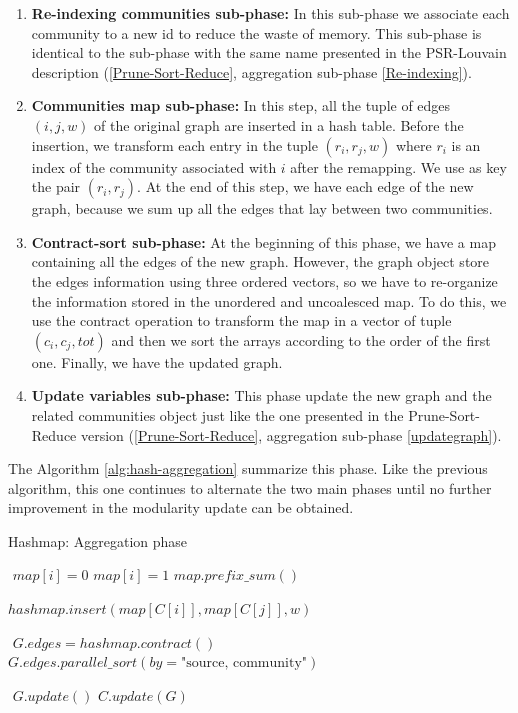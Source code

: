 \begin{enumerate}
	\item \textbf{Re-indexing communities sub-phase:} In this sub-phase we associate each community to a new id to reduce the waste of memory. This sub-phase is identical to the sub-phase with the same name presented in the PSR-Louvain description (\ref{Prune-Sort-Reduce}, aggregation sub-phase \ref{Re-indexing}). 
	\item \textbf{Communities map sub-phase:} In this step, all the tuple of edges $(i, j, w)$ of the original graph are inserted in a hash table. Before the insertion, we transform each entry in the tuple $(r_i, r_j, w)$ where $r_i$ is an index of the community associated with $i$ after the remapping. We use as key the pair $(r_i, r_j)$. At the end of this step, we have each edge of the new graph, because we sum up all the edges that lay between two communities.
	\item \textbf{Contract-sort sub-phase:} At the beginning of this phase, we have a map containing all the edges of the new graph. However, the graph object store the edges information using three ordered vectors, so we have to re-organize the information stored in the unordered and uncoalesced map. To do this, we use the contract operation to transform the map in a vector of tuple $(c_i, c_j, tot)$ and then we sort the arrays according to the order of the first one. Finally, we have the updated graph.
	\item \textbf{Update variables sub-phase:} This phase update the new graph and the related communities object just like the one presented in the Prune-Sort-Reduce version (\ref{Prune-Sort-Reduce}, aggregation sub-phase \ref{updategraph}).
\end{enumerate}
The Algorithm \ref{alg:hash-aggregation} summarize this phase. 
Like the previous algorithm, this one continues to alternate the two main phases until no further improvement in the modularity update can be obtained.
\begin{algorithm}
	\caption{Hashmap: Aggregation phase}\label{alg:hash-aggregation}
	\begin{algorithmic}
		\State $ $
		\State $map[i] = 0$
		\Else
		\State $map[i] = 1$
		\EndIf
		\EndFor 
		\State $map.prefix\_sum()$
		\State $ $
		
			\State $hashmap.insert(map[C[i]],map[C[j]],w)$
		\EndFor 
		
		\State $ $
		\State $G.edges = hashmap.contract()$
		\State $G.edges.parallel\_sort(by= \text{"source, community"})$
		\State 
		
		\State $ $
		\State $G.update()$
		\State $C.update(G)$
		
		\EndProcedure
	\end{algorithmic}
\end{algorithm}

